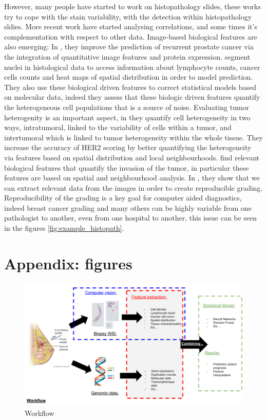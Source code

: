 \documentclass[a4paper,10pt]{article}
\begin{document}
However, many people have started to work on histopathology slides, these works try to cope with the stain variability, with the detection within histopathology sldies. More recent work have started analysing correlations, and some times it's complementation with respect to other data. Image-based biological features are also emerging: In \citet{lee2015supervised}, they improve the prediction of recurrent prostate cancer via the integration of quantitative image features and protein expression. \citet{yuan2012quantitative} segment nuclei in histological data to access information about lymphocyte counts, cancer cells counts and heat maps of spatial distribution in order to model prediction.  They also use these biological driven features to correct statistical models based on molecular data, indeed they assess that these biologic driven features quantify the heterogeneous cell populations that is a source of noise. Evaluating tumor heterogenity is an important aspect, in \citet{potts2012evaluating} they quantify cell heterogeneity in two ways, intratumoral, linked to the variability of cells within a tumor, and intertumoral which is linked to tumor heterogeneity within the whole tissue. They increase the accuracy of HER2 scoring by better quantifying the heterogeneity via features based on spatial distribution and local neighbourhoods. \citet{harder2016cooccurence} find relevant biological features that quantify the invasion of the tumor, in particular these features are based on spatial and neighbourhood analysis. In \citet{petushi2006large}, they show that we can extract relevant data from the images in order to create reproducible grading. Reproducibility of the grading is a key goal for computer aided diagnostics, indeed breast cancer grading and many others can be highly variable from one pathologist to another, even from one hospital to another, this issue can be seen in the figures \ref{fig:example_histopath}. 

\newpage


%


\newpage

\section{Appendix: figures}
\begin{figure}[!ht]
\centering
\includegraphics[width=\textwidth]{Workflow_overview.png}
\caption{Workflow}
\label{workflow1}
\end{figure}
\end{document}
